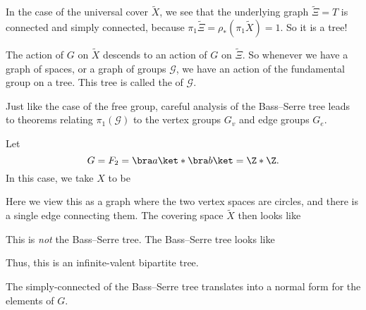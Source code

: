 \documentclass[a4paper]{article}
\begin{document}
In the case of the universal cover $\tilde{X}$, we see that the underlying graph $\tilde{\Xi} = T$ is connected and simply connected, because $\pi_1 \tilde{\Xi} = \rho_*(\pi_1 \tilde{X}) = 1$. So it is a tree!

The action of $G$ on $\tilde{X}$ descends to an action of $G$ on $\tilde{\Xi}$. So whenever we have a graph of spaces, or a graph of groups $\mathcal{G}$, we have an action of the fundamental group on a tree. This tree is called the  of $\mathcal{G}$.

Just like the case of the free group, careful analysis of the Bass--Serre tree leads to theorems relating $\pi_1(\mathcal{G})$ to the vertex groups $G_v$ and edge groups $G_e$.

\begin{eg}
  Let
  \[
    G = F_2 = \bra a\ket * \bra b\ket = \Z * \Z.
  \]
  In this case, we take $X$ to be

  \begin{center}
  \end{center}
  Here we view this as a graph where the two vertex spaces are circles, and there is a single edge connecting them. The covering space $\tilde{X}$ then looks like
  \begin{center}
  \end{center}
  This is \emph{not} the Bass--Serre tree. The Bass--Serre tree looks like %

  Thus, this is an infinite-valent bipartite tree.
\end{eg}

The simply-connected of the Bass--Serre tree translates into a normal form for the elements of $G$.
\end{document}
